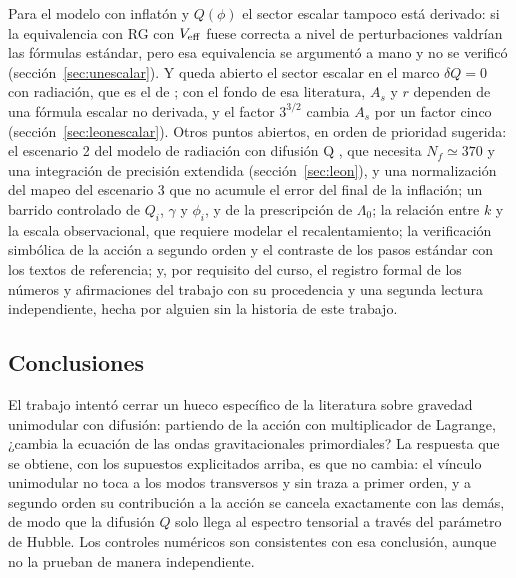 Para el modelo con inflatón y $Q(\phi)$ el sector escalar tampoco está derivado: si la equivalencia con RG con $V_{\rm eff}$ fuese correcta a nivel de perturbaciones valdrían las fórmulas estándar, pero esa equivalencia se argumentó a mano y no se verificó (sección~\ref{sec:unescalar}). Y queda abierto el sector escalar en el marco $\delta Q=0$ con radiación, que es el de \cite{leon22,piccirilli23}; con el fondo de esa literatura, $A_s$ y $r$ dependen de una fórmula escalar no derivada, y el factor $3^{3/2}$ cambia $A_s$ por un factor cinco (sección~\ref{sec:leonescalar}). Otros puntos abiertos, en orden de prioridad sugerida: el escenario 2 del modelo de radiación con difusión Q \cite{leon22,piccirilli23}, que necesita $N_f\simeq370$ y una integración de precisión extendida (sección~\ref{sec:leon}), y una normalización del mapeo del escenario 3 que no acumule el error del final de la inflación; un barrido controlado de $Q_i$, $\gamma$ y $\phi_i$, y de la prescripción de $\Lambda_0$; la relación entre $k$ y la escala observacional, que requiere modelar el recalentamiento; la verificación simbólica de la acción a segundo orden y el contraste de los pasos estándar con los textos de referencia; y, por requisito del curso, el registro formal de los números y afirmaciones del trabajo con su procedencia y una segunda lectura independiente, hecha por alguien sin la historia de este trabajo.

\subsection{Conclusiones}

El trabajo intentó cerrar un hueco específico de la literatura sobre gravedad unimodular con difusión: partiendo de la acción con multiplicador de Lagrange, ¿cambia la ecuación de las ondas gravitacionales primordiales? La respuesta que se obtiene, con los supuestos explicitados arriba, es que no cambia: el vínculo unimodular no toca a los modos transversos y sin traza a primer orden, y a segundo orden su contribución a la acción se cancela exactamente con las demás, de modo que la difusión $Q$ solo llega al espectro tensorial a través del parámetro de Hubble. Los controles numéricos son consistentes con esa conclusión, aunque no la prueban de manera independiente.

